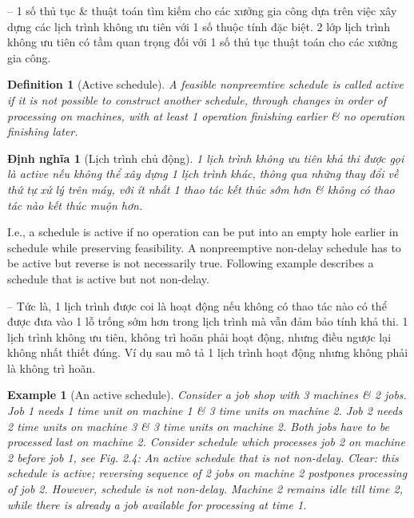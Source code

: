 \documentclass{article}
\newtheorem{definition}{Definition}
\newtheorem{dinhnghia}{Định nghĩa}
\newtheorem{example}{Example}
\begin{document}
\begin{itemize}
\begin{itemize}
        -- 1 số thủ tục \& thuật toán tìm kiếm cho các xưởng gia công dựa trên việc xây dựng các lịch trình không ưu tiên với 1 số thuộc tính đặc biệt. 2 lớp lịch trình không ưu tiên có tầm quan trọng đối với 1 số thủ tục thuật toán cho các xưởng gia công.

        \begin{definition}[Active schedule]
            A feasible nonpreemtive schedule is called {\rm active} if it is not possible to construct another schedule, through changes in order of processing on machines, with at least 1 operation finishing earlier \& no operation finishing later.
        \end{definition}

        \begin{dinhnghia}[Lịch trình chủ động]
            1 lịch trình không ưu tiên khả thi được gọi là {\rm active} nếu không thể xây dựng 1 lịch trình khác, thông qua những thay đổi về thứ tự xử lý trên máy, với ít nhất 1 thao tác kết thúc sớm hơn \& không có thao tác nào kết thúc muộn hơn.
        \end{dinhnghia}
        I.e., a schedule is active if no operation can be put into an empty hole earlier in schedule while preserving feasibility. A nonpreemptive non-delay schedule has to be active but reverse is not necessarily true. Following example describes a schedule that is active but not non-delay.

        -- Tức là, 1 lịch trình được coi là hoạt động nếu không có thao tác nào có thể được đưa vào 1 lỗ trống sớm hơn trong lịch trình mà vẫn đảm bảo tính khả thi. 1 lịch trình không ưu tiên, không trì hoãn phải hoạt động, nhưng điều ngược lại không nhất thiết đúng. Ví dụ sau mô tả 1 lịch trình hoạt động nhưng không phải là không trì hoãn.

        \begin{example}[An active schedule]
            Consider a job shop with 3 machines \& 2 jobs. Job 1 needs 1 time unit on machine 1 \& 3 time units on machine 2. Job 2 needs 2 time units on machine 3 \& 3 time units on machine 2. Both jobs have to be processed last on machine 2. Consider schedule which processes job 2 on machine 2 before job 1, see {\sf Fig. 2.4: An active schedule that is not non-delay}. Clear: this schedule is active; reversing sequence of 2 jobs on machine 2 postpones processing of job 2. However, schedule is not non-delay. Machine 2 remains idle till time 2, while there is already a job available for processing at time 1.


\end{example}
\end{itemize}
\end{itemize}
\end{document}
